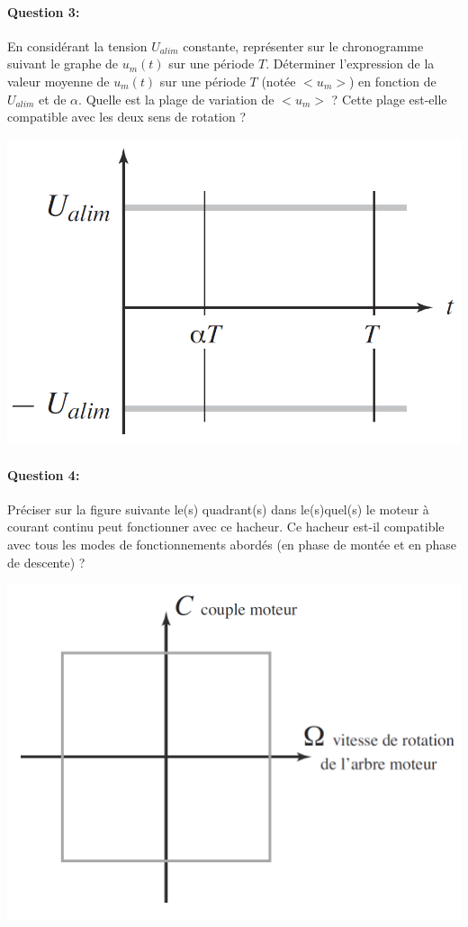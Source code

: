 \paragraph{Question 3:}

En considérant la tension $U_{alim}$ constante, représenter sur le chronogramme suivant le graphe de
$u_m(t)$ sur une période $T$. Déterminer l'expression de la valeur moyenne de $u_m(t)$ sur une période $T$ (notée $<u_m>$) en fonction de $U_{alim}$ et de $\alpha$. Quelle est la plage de variation de $<u_m>$ ? Cette plage est-elle compatible avec les deux sens de rotation ?

\begin{center}
 \includegraphics[width=0.8\linewidth]{img/td02_11}
\end{center}

\paragraph{Question 4:}

Préciser sur la figure suivante le(s) quadrant(s) dans le(s)quel(s) le moteur à courant continu peut fonctionner avec ce hacheur. Ce hacheur est-il compatible avec tous les modes de fonctionnements abordés (en phase de montée et en phase de descente) ?

\begin{center}
 \includegraphics[width=0.8\linewidth]{img/td02_12}
\end{center}


